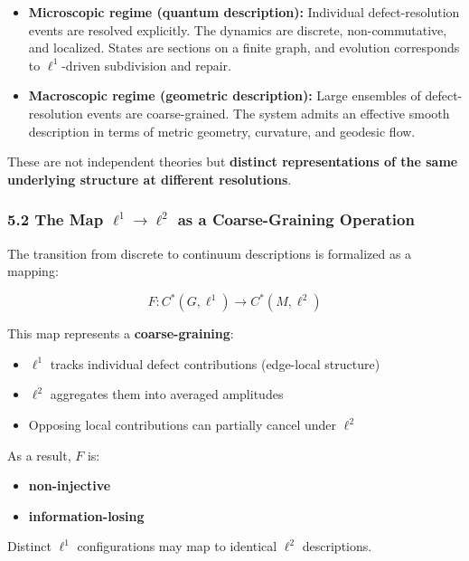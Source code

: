 \documentclass[
]{article}
\providecommand{\tightlist}{%
  \setlength{\itemsep}{0pt}\setlength{\parskip}{0pt}}
\begin{document}
\begin{itemize}
\item
  \textbf{Microscopic regime (quantum description):} Individual
  defect-resolution events are resolved explicitly. The dynamics are
  discrete, non-commutative, and localized. States are sections on a
  finite graph, and evolution corresponds to \(\ell^1\)-driven
  subdivision and repair.
\item
  \textbf{Macroscopic regime (geometric description):} Large ensembles
  of defect-resolution events are coarse-grained. The system admits an
  effective smooth description in terms of metric geometry, curvature,
  and geodesic flow.
\end{itemize}

These are not independent theories but \textbf{distinct representations
of the same underlying structure at different resolutions}.

\subsubsection{\texorpdfstring{5.2 The Map \(\ell^1 \to \ell^2\) as a
Coarse-Graining
Operation}{5.2 The Map \textbackslash ell\^{}1 \textbackslash to \textbackslash ell\^{}2 as a Coarse-Graining Operation}}\label{the-map-ell1-to-ell2-as-a-coarse-graining-operation}

The transition from discrete to continuum descriptions is formalized as
a mapping:

\[F: C^*(G, \ell^1) \to C^*(M, \ell^2)\]

This map represents a \textbf{coarse-graining}:

\begin{itemize}
\tightlist
\item
  \(\ell^1\) tracks individual defect contributions (edge-local
  structure)
\item
  \(\ell^2\) aggregates them into averaged amplitudes
\item
  Opposing local contributions can partially cancel under \(\ell^2\)
\end{itemize}

As a result, \(F\) is:

\begin{itemize}
\tightlist
\item
  \textbf{non-injective}
\item
  \textbf{information-losing}
\end{itemize}

Distinct \(\ell^1\) configurations may map to identical \(\ell^2\)
descriptions.
\end{document}
